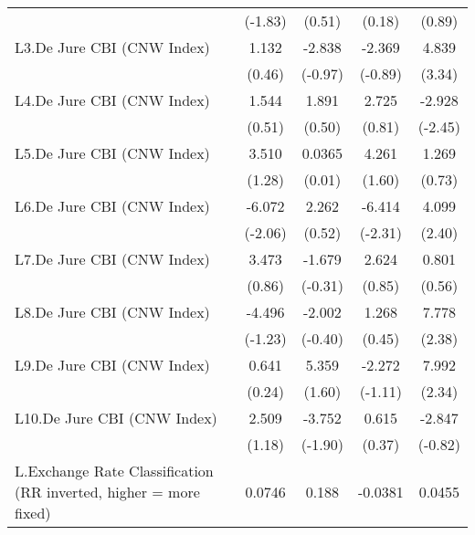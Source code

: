 {\begin{longtable}{l*{4}{c}}
                &  (-1.83)         &   (0.51)         &   (0.18)         &   (0.89)         \\
\addlinespace
L3.De Jure CBI (CNW Index)&    1.132         &   -2.838         &   -2.369         &    4.839\sym{***}\\
                &   (0.46)         &  (-0.97)         &  (-0.89)         &   (3.34)         \\
\addlinespace
L4.De Jure CBI (CNW Index)&    1.544         &    1.891         &    2.725         &   -2.928\sym{*}  \\
                &   (0.51)         &   (0.50)         &   (0.81)         &  (-2.45)         \\
\addlinespace
L5.De Jure CBI (CNW Index)&    3.510         &   0.0365         &    4.261         &    1.269         \\
                &   (1.28)         &   (0.01)         &   (1.60)         &   (0.73)         \\
\addlinespace
L6.De Jure CBI (CNW Index)&   -6.072\sym{*}  &    2.262         &   -6.414\sym{*}  &    4.099\sym{*}  \\
                &  (-2.06)         &   (0.52)         &  (-2.31)         &   (2.40)         \\
\addlinespace
L7.De Jure CBI (CNW Index)&    3.473         &   -1.679         &    2.624         &    0.801         \\
                &   (0.86)         &  (-0.31)         &   (0.85)         &   (0.56)         \\
\addlinespace
L8.De Jure CBI (CNW Index)&   -4.496         &   -2.002         &    1.268         &    7.778\sym{*}  \\
                &  (-1.23)         &  (-0.40)         &   (0.45)         &   (2.38)         \\
\addlinespace
L9.De Jure CBI (CNW Index)&    0.641         &    5.359         &   -2.272         &    7.992\sym{*}  \\
                &   (0.24)         &   (1.60)         &  (-1.11)         &   (2.34)         \\
\addlinespace
L10.De Jure CBI (CNW Index)&    2.509         &   -3.752         &    0.615         &   -2.847         \\
                &   (1.18)         &  (-1.90)         &   (0.37)         &  (-0.82)         \\
\addlinespace
L.Exchange Rate Classification (RR inverted, higher = more fixed)&   0.0746         &    0.188         &  -0.0381         &   0.0455         \\

\end{longtable}}
